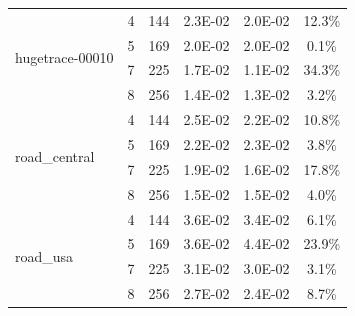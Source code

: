 \documentclass[conference, 10ppt]{IEEEtran}
\begin{document}
\begin{table}[htb]
\begin{tabular}[c]{| l | c | c | c | c | c |}
\multirow{4}{*}{hugetrace-00010}  &  4  &  144  &  2.3E-02  &  2.0E-02  &  12.3\% \\ \cline{2-6}
 &  5  &  169  &  2.0E-02  &  2.0E-02  &  0.1\% \\ \cline{2-6}
 &  7  &  225  &  1.7E-02  &  1.1E-02  &  34.3\% \\ \cline{2-6}
 &  8  &  256  &  1.4E-02  &  1.3E-02  &  3.2\% \\ \hline
\multirow{4}{*}{road\_central}  &  4  &  144  &  2.5E-02  &  2.2E-02  &  10.8\% \\ \cline{2-6}
 &  5  &  169  &  2.2E-02  &  2.3E-02  &  3.8\% \\ \cline{2-6}
 &  7  &  225  &  1.9E-02  &  1.6E-02  &  17.8\% \\ \cline{2-6}
 &  8  &  256  &  1.5E-02  &  1.5E-02  &  4.0\% \\ \hline
\multirow{4}{*}{road\_usa}  &  4  &  144  &  3.6E-02  &  3.4E-02  &  6.1\% \\ \cline{2-6}
 &  5  &  169  &  3.6E-02  &  4.4E-02  &  23.9\% \\ \cline{2-6}
 &  7  &  225  &  3.1E-02  &  3.0E-02  &  3.1\% \\ \cline{2-6}
 &  8  &  256  &  2.7E-02  &  2.4E-02  &  8.7\% \\ \hline

\end{tabular}
\end{table}
\end{document}

